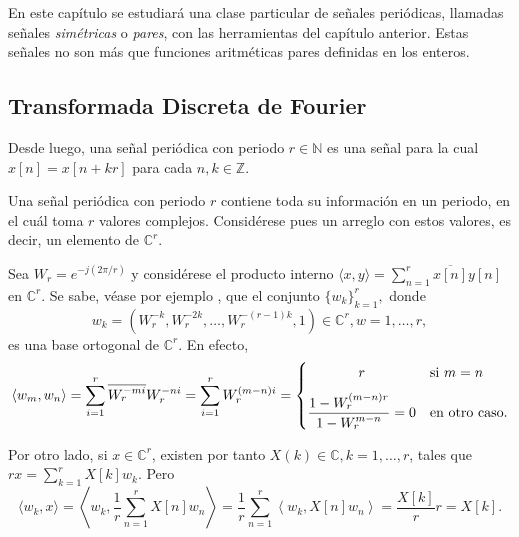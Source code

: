 En este capítulo se estudiará una clase particular de señales periódicas, llamadas señales \emph{simétricas} o \emph{pares}, con las herramientas del capítulo anterior. Estas señales no son más que funciones aritméticas pares definidas en los enteros.

\subsection{Transformada Discreta de Fourier}

\begin{definition}
Desde luego, una señal periódica con periodo $r \in \mathbb{N}$ es una señal para la cual $x[n] = x[n + k r]$ para cada $n,k \in \mathbb{Z}$.
\end{definition}

Una señal periódica con periodo $r$ contiene toda su información en un periodo, en el cuál toma $r$ valores complejos. Considérese pues un arreglo con estos valores, es decir, un elemento de $\mathbb{C}^r$.
\bigskip

Sea $W_r = e^{-j(2 \pi / r)}$ y considérese el producto interno $\langle x,y \rangle = \sum_{n=1}^{r} \overline{x[n]} y[n]$ en $\mathbb{C}^r$. Se sabe, véase por ejemplo \cite{Prand1}, que el conjunto $\{ w_k \}_{k=1}^r,$ donde \begin{equation*}
    w_k = (W_r^{-k}, W_r^{-2 k}, \ldots, W_r^{-(r-1) k}, 1) \in \mathbb{C}^r, w=1,\ldots,r,
\end{equation*}
es una base ortogonal de $\mathbb{C}^r$. En efecto,
\begin{equation*}
    \langle w_m, w_n \rangle = \sum_{i=1}^{r} \overline{W_r^{-m i}} W_r^{-n i} = \sum_{i=1}^{r} W_r^{(m-n)i} = \begin{cases}
        \hfil r & \text{si } m=n \\[7pt]
        \hfil \displaystyle\frac{1-W_r^{(m-n)r}}{1-W_r^{m-n}} = 0 & \text{en otro caso}.
    \end{cases}
\end{equation*}

Por otro lado, si $x \in \mathbb{C}^r$, existen por tanto $X(k) \in \mathbb{C}, k=1,\ldots,r$, tales que $r x = \sum_{k=1}^{r} X[k] w_k$. Pero
\begin{equation*}
    \langle w_k, x \rangle = \left\langle w_k, \frac{1}{r} \sum_{n=1}^{r} X[n] w_n \right\rangle = \frac{1}{r} \sum_{n=1}^{r} \left\langle w_k, X[n] w_n \right\rangle = \frac{X[k]}{r} r = X[k].
\end{equation*}

